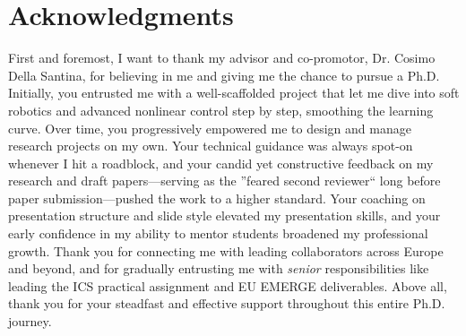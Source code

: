 \chapter*{Acknowledgments}

First and foremost, I want to thank my advisor and co-promotor, Dr. Cosimo Della Santina, for believing in me and giving me the chance to pursue a Ph.D. Initially, you entrusted me with a well-scaffolded project that let me dive into soft robotics and advanced nonlinear control step by step, smoothing the learning curve. Over time, you progressively empowered me to design and manage research projects on my own. Your technical guidance was always spot-on whenever I hit a roadblock, and your candid yet constructive feedback on my research and draft papers—serving as the ''feared second reviewer`` long before paper submission—pushed the work to a higher standard. Your coaching on presentation structure and slide style elevated my presentation skills, and your early confidence in my ability to mentor students broadened my professional growth. Thank you for connecting me with leading collaborators across Europe and beyond, and for gradually entrusting me with \emph{senior} responsibilities like leading the ICS practical assignment and EU EMERGE deliverables. Above all, thank you for your steadfast and effective support throughout this entire Ph.D. journey.

